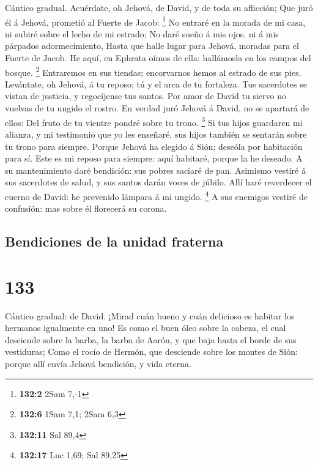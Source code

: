  Cántico gradual. Acuérdate, oh Jehová, de David, y de toda
su aflicción;  Que juró él á Jehová, prometió al Fuerte de
Jacob: \footnote{\textbf{132:2} 2Sam 7,-1}  No entraré en la
morada de mi casa, ni subiré sobre el lecho de mi estrado; 
No daré sueño á mis ojos, ni á mis párpados adormecimiento, 
Hasta que halle lugar para Jehová, moradas para el Fuerte de Jacob.
 He aquí, en Ephrata oímos de ella: hallámosla en los campos
del bosque. \footnote{\textbf{132:6} 1Sam 7,1; 2Sam 6,3} 
Entraremos en sus tiendas; encorvarnos hemos al estrado de sus pies.
 Levántate, oh Jehová, á tu reposo; tú y el arca de tu
fortaleza.  Tus sacerdotes se vistan de justicia, y
regocíjense tus santos.  Por amor de David tu siervo no
vuelvas de tu ungido el rostro.  En verdad juró Jehová á
David, no se apartará de ellos: Del fruto de tu vientre pondré sobre tu
trono. \footnote{\textbf{132:11} Sal 89,4}  Si tus hijos
guardaren mi alianza, y mi testimonio que yo les enseñaré, sus hijos
también se sentarán sobre tu trono para siempre.  Porque
Jehová ha elegido á Sión; deseóla por habitación para sí. 
Este es mi reposo para siempre: aquí habitaré, porque la he deseado.
 A su mantenimiento daré bendición: sus pobres saciaré de
pan.  Asimismo vestiré á sus sacerdotes de salud, y sus
santos darán voces de júbilo.  Allí haré reverdecer el
cuerno de David: he prevenido lámpara á mi ungido. \footnote{\textbf{132:17}
  Luc 1,69; Sal 89,25}  A sus enemigos vestiré de
confusión: mas sobre él florecerá su corona.

\hypertarget{bendiciones-de-la-unidad-fraterna}{%
\subsection{Bendiciones de la unidad
fraterna}\label{bendiciones-de-la-unidad-fraterna}}

\hypertarget{section-132}{%
\section{133}\label{section-132}}

 Cántico gradual: de David. ¡Mirad cuán bueno y cuán
delicioso es habitar los hermanos igualmente en uno!  Es
como el buen óleo sobre la cabeza, el cual desciende sobre la barba, la
barba de Aarón, y que baja hasta el borde de sus vestiduras;
 Como el rocío de Hermón, que desciende sobre los montes de
Sión: porque allí envía Jehová bendición, y vida eterna.

